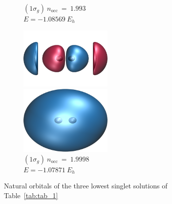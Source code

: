 \documentclass[aps,prb,reprint,showkeys,superscriptaddress]{revtex4-1}
\begin{document}
\begin{figure}
\begin{subfigure}[b]{0.31\textwidth}
    \caption*{\centering $(1\sigma_g)~n_\text{occ}~=~1.993$ \protect\\ $E=-1.08569~E_h$}
  \end{subfigure}
  \begin{subfigure}[b]{0.31\textwidth}
    \includegraphics[width=0.5\textwidth]{Figures/h2_HF_mo4.cube.png}
    \caption*{\centering $(2\sigma_u)~n_\text{occ}~=~0.0002$}
    \includegraphics[width=0.5\textwidth]{Figures/h2_HF_mo1.cube.png}
    \caption*{\centering $(1\sigma_g)~n_\text{occ}~=~1.9998$ \protect\\ $E=-1.07871~E_h$}
  \end{subfigure}
  \caption{Natural orbitals of the three lowest singlet solutions of Table~\ref{tab:tab_1} \label{fig:fig_4}}
\end{figure}
\end{document}
